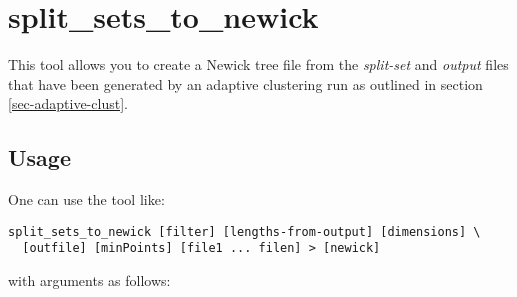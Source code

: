 \section{split\_sets\_to\_newick} \label{sec-ssnewick}

This tool allows you to create a Newick \cite{newick} tree file from the
\emph{split-set} and \emph{output} files that have been generated by
an adaptive clustering run as outlined in section
\ref{sec-adaptive-clust}.

\subsection{Usage}

One can use the tool like:

\begin{lstlisting}
split_sets_to_newick [filter] [lengths-from-output] [dimensions] \
  [outfile] [minPoints] [file1 ... filen] > [newick]
\end{lstlisting}
with arguments as follows:
